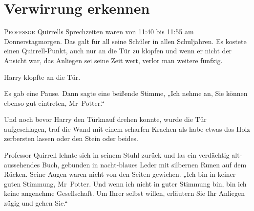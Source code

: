 \chapter{Verwirrung erkennen}


\lettrine{P}{rofessor} Quirrells Sprechzeiten waren von 11:40 bis 11:55 am Donnerstagmorgen. Das galt für all seine Schüler in allen Schuljahren. Es kostete einen Quirrell-Punkt, auch nur an die Tür zu klopfen und wenn er nicht der Ansicht war, das Anliegen sei seine Zeit wert, verlor man weitere fünfzig.

Harry klopfte an die Tür.

Es gab eine Pause. Dann sagte eine beißende Stimme, „Ich nehme an, Sie können ebenso gut eintreten, Mr~Potter.“

Und noch bevor Harry den Türknauf drehen konnte, wurde die Tür aufgeschlagen, traf die Wand mit einem scharfen Krachen als habe etwas das Holz zerbersten lassen oder den Stein oder beides.

Professor Quirrell lehnte sich in seinem Stuhl zurück und las ein verdächtig alt-aussehendes Buch, gebunden in nacht-blaues Leder mit silbernen Runen auf dem Rücken. Seine Augen waren nicht von den Seiten gewichen. „Ich bin in keiner guten Stimmung, Mr~Potter. Und wenn ich nicht in guter Stimmung bin, bin ich keine angenehme Gesellschaft. Um Ihrer selbst willen, erläutern Sie Ihr Anliegen zügig und gehen Sie.“

